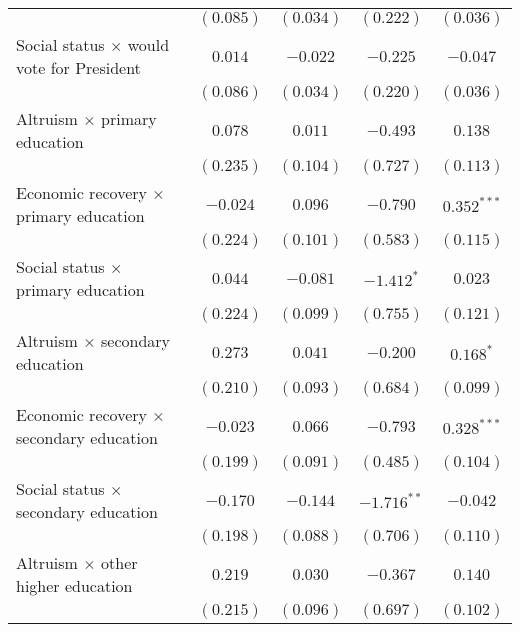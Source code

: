 \begin{table}
\begin{center}
\begin{tabular}{l c c c c}
                                                    & $(0.085)$     & $(0.034)$     & $(0.222)$     & $(0.036)$      \\
Social status $\times$ would vote for President     & $0.014$       & $-0.022$      & $-0.225$      & $-0.047$       \\
                                                    & $(0.086)$     & $(0.034)$     & $(0.220)$     & $(0.036)$      \\
Altruism $\times$ primary education                 & $0.078$       & $0.011$       & $-0.493$      & $0.138$        \\
                                                    & $(0.235)$     & $(0.104)$     & $(0.727)$     & $(0.113)$      \\
Economic recovery $\times$ primary education        & $-0.024$      & $0.096$       & $-0.790$      & $0.352^{***}$  \\
                                                    & $(0.224)$     & $(0.101)$     & $(0.583)$     & $(0.115)$      \\
Social status $\times$ primary education            & $0.044$       & $-0.081$      & $-1.412^{*}$  & $0.023$        \\
                                                    & $(0.224)$     & $(0.099)$     & $(0.755)$     & $(0.121)$      \\
Altruism $\times$ secondary education               & $0.273$       & $0.041$       & $-0.200$      & $0.168^{*}$    \\
                                                    & $(0.210)$     & $(0.093)$     & $(0.684)$     & $(0.099)$      \\
Economic recovery $\times$ secondary education      & $-0.023$      & $0.066$       & $-0.793$      & $0.328^{***}$  \\
                                                    & $(0.199)$     & $(0.091)$     & $(0.485)$     & $(0.104)$      \\
Social status $\times$ secondary education          & $-0.170$      & $-0.144$      & $-1.716^{**}$ & $-0.042$       \\
                                                    & $(0.198)$     & $(0.088)$     & $(0.706)$     & $(0.110)$      \\
Altruism $\times$ other higher education            & $0.219$       & $0.030$       & $-0.367$      & $0.140$        \\
                                                    & $(0.215)$     & $(0.096)$     & $(0.697)$     & $(0.102)$      \\

\end{tabular}
\end{center}
\end{table}
